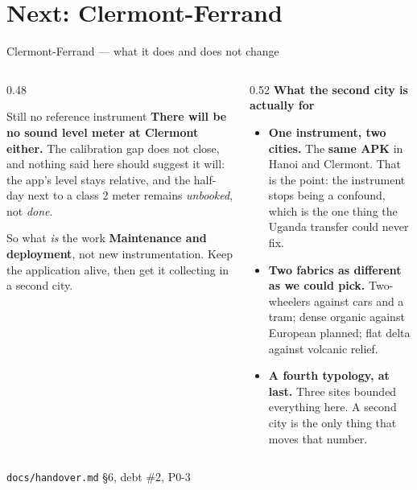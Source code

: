 \documentclass[aspectratio=169,10pt]{beamer}
\newcommand{\src}[1]{{\scriptsize\color{muted}\texttt{#1}}}
\newcommand{\aside}[1]{{\scriptsize\color{muted}#1}}
\newcommand{\up}[1]{\textcolor{good}{\textbf{#1}}}
\newcommand{\wn}[1]{\textcolor{warn}{\textbf{#1}}}
\begin{document}
\section{Next: Clermont-Ferrand}

\begin{frame}{Clermont-Ferrand --- what it does and does not change}
  \begin{columns}[T]
    \begin{column}{0.48\textwidth}
      \begin{alertblock}{Still no reference instrument}
        \textbf{There will be no sound level meter at Clermont either.} The
        calibration gap does not close, and nothing said here should suggest it
        will: the app's level stays relative, and the half-day next to a class 2
        meter remains \emph{unbooked}, not \emph{done}.
      \end{alertblock}
      \vspace{.3em}
      \begin{exampleblock}{So what \emph{is} the work}
        \textbf{Maintenance and deployment}, not new instrumentation. Keep the
        application alive, then get it collecting in a second city.
      \end{exampleblock}
    \end{column}
    \begin{column}{0.52\textwidth}
      \textbf{What the second city is actually for}
      \begin{itemize}
        \item \up{One instrument, two cities.} The \textbf{same APK} in Hanoi and
              Clermont. That is the point: the instrument stops being a confound,
              which is the one thing the Uganda transfer could never fix.
        \item \up{Two fabrics as different as we could pick.} Two-wheelers against
              cars and a tram; dense organic against European planned; flat delta
              against volcanic relief.
        \item \wn{A fourth typology, at last.} Three sites bounded everything
              here. A second city is the only thing that moves that number.
      \end{itemize}
    \end{column}
  \end{columns}
  \vfill
  \src{docs/handover.md} \; \aside{\S6, debt \#2, P0-3}
\end{frame}
\end{document}
